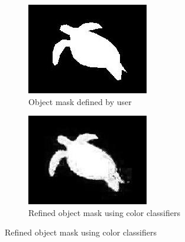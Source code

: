 \documentclass[12pt]{article}
\begin{document}
\begin{figure}
    \begin{subfigure}[t]{.49\textwidth}
        \centering
        \includegraphics[width=\linewidth]{img/mask_user}
        \caption{Object mask defined by user}
        \label{fig_mask_refine_a}
    \end{subfigure}\hfill
    \begin{subfigure}[t]{.49\textwidth}
        \centering
        \includegraphics[width=\linewidth]{img/mask_refined}
        \caption{Refined object mask using color classifiers}
        \label{fig_mask_refine_b}
    \end{subfigure}
    \label{fig_mask_refine}
\end{figure}
\end{document}
